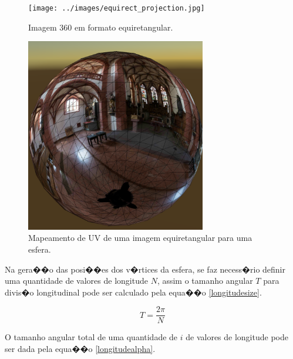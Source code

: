 \documentclass[12pt]{article}
\begin{document}
\begin{figure}[!tbp]
  \centering
  \begin{minipage}[b]{0.40\textwidth}
    \texttt{[image: ../images/equirect\_projection.jpg]}
    \caption{Imagem 360 em formato equiretangular.}
    \label{fig:equirectimage}
  \end{minipage}
  \hfill
  \begin{minipage}[b]{0.44\textwidth}
    \centering
    \includegraphics[width=0.7\textwidth]{../images/sphere.png}
    \caption{Mapeamento de UV de uma imagem equiretangular para uma esfera.}
    \label{fig:equisphere}
  \end{minipage}
\end{figure}

Na gera��o das posi��es dos v�rtices da esfera, se faz necess�rio definir uma quantidade de valores de longitude $N$, assim o tamanho angular $T$ para divis�o longitudinal pode ser calculado pela equa��o \ref{longitudesize}.


\begin{equation}
T = \frac{2 \pi}{N}
\label{longitudesize}
\end{equation}

O tamanho angular total de uma quantidade de $i$ de valores de longitude pode ser dada pela equa��o \ref{longitudealpha}.
\end{document}
